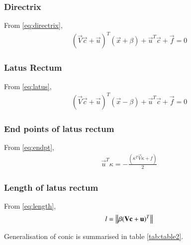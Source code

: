 \documentclass[journal,12pt,twocolumn]{IEEEtran}
\begin{document}
\subsubsection{Directrix}
From \eqref{eq:directrix},
\begin{align}
    (\vec{V}\vec{c}+\vec{u})^T(\vec{x} +\beta) + \vec{u}^T\vec{c} + \vec{f} = 0
\end{align}
\subsubsection{Latus Rectum}
From \eqref{eq:latus},
\begin{align}
    (\vec{V}\vec{c}+\vec{u})^T(\vec{x} -\beta) + \vec{u}^T\vec{c} + \vec{f} = 0
\end{align}
\subsubsection{End points of latus rectum}
From \eqref{eq:endpt},
\begin{align}
    \vec{u}^T\kappa = -\frac{(\kappa^T\vec{V}\kappa + f )}{2}
\end{align}
\subsubsection{Length of latus rectum}
From \eqref{eq:length},
\begin{align}
   l=\left\lVert\beta(\mathbf{V}\mathbf{c}+\mathbf{u})^T\right\rVert 
\end{align}

Generalisation of conic is summarised in table \ref{tab:table2}.
\end{document}
